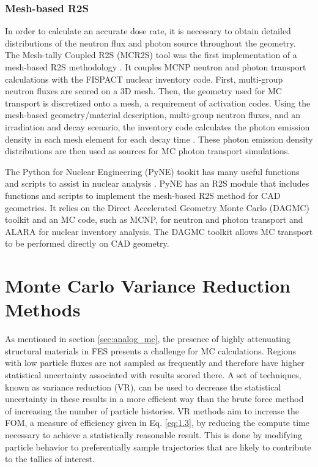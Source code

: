 \subsubsection{Mesh-based R2S}
In order to calculate an accurate dose rate, it is necessary to obtain
detailed distributions of the neutron flux and photon source
throughout the geometry.
The Mesh-tally Coupled R2S (MCR2S) tool was the first implementation of a mesh-based R2S methodology
\cite{mcr2s}.  It couples MCNP neutron and photon transport calculations with
the FISPACT nuclear inventory code. First, multi-group neutron fluxes are
scored on a 3D mesh.
Then, the geometry used for MC
transport is discretized onto a mesh, a requirement of activation codes.  Using
the mesh-based geometry/material description,
multi-group neutron fluxes, and an irradiation and decay scenario, the inventory code
calculates the photon emission density in each mesh element for each decay time
\cite{mcr2s}.  These photon emission density distributions are then used as
sources for MC photon transport simulations.  

The Python for Nuclear Engineering (PyNE) tookit has many useful functions and
scripts to assist in nuclear analysis \cite{pyne}. 
PyNE has an R2S module \cite{mesh_r2s} that includes functions and scripts to 
implement the mesh-based R2S method for CAD
geometries.  It relies on the Direct Accelerated Geometry Monte Carlo (DAGMC) toolkit and an MC
code, such as MCNP, for neutron and
photon transport and ALARA \cite{alara} for nuclear inventory analysis.  
The DAGMC toolkit allows MC transport to be performed directly on CAD geometry.

\section{Monte Carlo Variance Reduction Methods}\label{sec:vr_methods}

As mentioned in section \ref{sec:analog_mc}, the presence of highly attenuating
structural materials in 
FES presents a challenge for MC calculations.
Regions with low particle fluxes are not sampled as frequently and therefore
have higher statistical uncertainty associated with results scored there.
A set of techniques, known as variance reduction (VR), can be used to decrease
the statistical uncertainty in these results in a more efficient way than the
brute force method of increasing the number of particle histories.
VR methods aim to increase the FOM, a measure of efficiency given
in Eq. \ref{eq:1.3}, by reducing the compute time 
necessary to achieve a statistically reasonable result.
This is done by modifying particle behavior to preferentially sample trajectories that are likely to
contribute to the tallies of interest.

